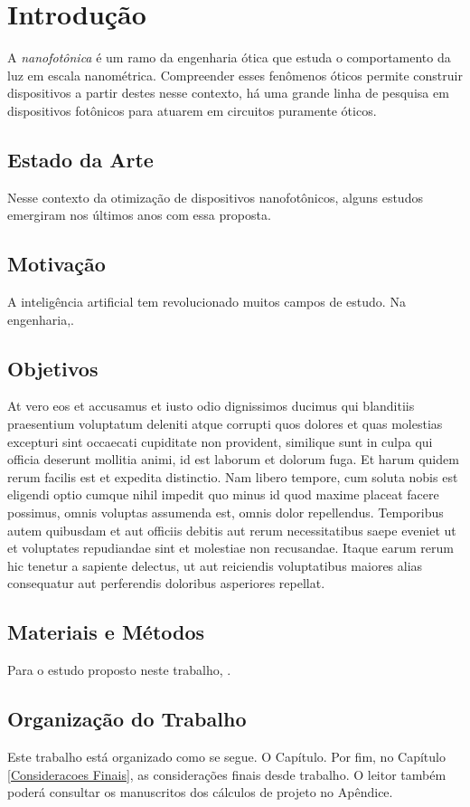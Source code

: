 \chapter{Introdução}      \label{Introducao}

A \textit{nanofotônica} é um ramo da engenharia ótica que estuda o comportamento da luz em escala nanométrica. Compreender esses fenômenos óticos permite construir dispositivos a partir destes nesse contexto, há uma grande linha de pesquisa em dispositivos fotônicos para atuarem em circuitos puramente óticos.


\section{Estado da Arte}

Nesse contexto da otimização de dispositivos nanofotônicos, alguns estudos emergiram nos últimos anos com essa proposta.


\section{Motivação}

A inteligência artificial tem revolucionado muitos campos de estudo. Na engenharia,.


\section{Objetivos}

At vero eos et accusamus et iusto odio dignissimos ducimus qui blanditiis praesentium voluptatum deleniti atque corrupti quos dolores et quas molestias excepturi sint occaecati cupiditate non provident, similique sunt in culpa qui officia deserunt mollitia animi, id est laborum et dolorum fuga. Et harum quidem rerum facilis est et expedita distinctio. Nam libero tempore, cum soluta nobis est eligendi optio cumque nihil impedit quo minus id quod maxime placeat facere possimus, omnis voluptas assumenda est, omnis dolor repellendus. Temporibus autem quibusdam et aut officiis debitis aut rerum necessitatibus saepe eveniet ut et voluptates repudiandae sint et molestiae non recusandae. Itaque earum rerum hic tenetur a sapiente delectus, ut aut reiciendis voluptatibus maiores alias consequatur aut perferendis doloribus asperiores repellat.


\section{Materiais e Métodos}

Para o estudo proposto neste trabalho, .


\section{Organização do Trabalho}

Este trabalho está organizado como se segue. O Capítulo. Por fim, no Capítulo \ref{Consideracoes Finais}, as considerações finais desde trabalho. O leitor também poderá consultar os manuscritos dos cálculos de projeto no Apêndice.